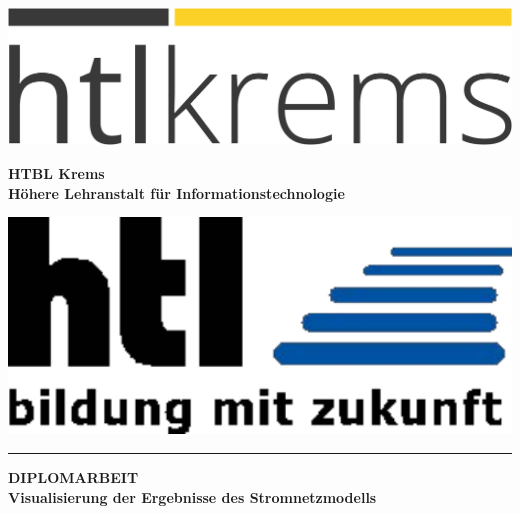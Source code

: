 \setlength{\headheight}{20pt}
\begin{titlepage}
\begin{minipage}[t]{2.5cm}
\vspace*{0.5cm}
\includegraphics[width=1\textwidth]{figures/HTL_Krems_Logo_SchwarzGelb_Neu.png}
\end{minipage}
\hfill
\begin{minipage}[t]{9.3cm}
\vspace*{0cm}
\centering
{\Large\normalfont\bfseries HTBL Krems}\\
\vspace*{0.25cm}
{\small\normalfont\bfseries Höhere Lehranstalt für Informationstechnologie}\\
\vspace*{0.5cm}
\end{minipage}
\hfill
\begin{minipage}[t]{2.5cm}
\vspace*{0.35cm}
\includegraphics[width=1\textwidth]{figures/htl.pdf}
\end{minipage}
\hrule

\vspace*{7cm}
\begin{center}
{\Huge \normalfont\bfseries DIPLOMARBEIT}\\
\vspace*{1cm}
{\LARGE \normalfont\bfseries Visualisierung der Ergebnisse des Stromnetzmodells}
\end{center}
\vspace*{7.1cm}


\end{titlepage}
